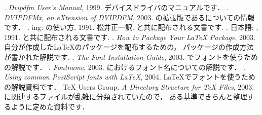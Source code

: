 \begin{myreferences}
%
 . \newblock
  {\em Dvipdfm User's Manual}, 1999. 
 \sanko {}
 \sanko デバイスドライバのマニュアルです．
%
 . \newblock
  {\em DVIPDFMx, an eXtension of DVIPDFM}, 2003.
  \sanko \webDvipdfmx
  \sanko {}の拡張版である\prog{\Dvipdfmx}についての情報です．
%
 . \newblock
  \BibTeX ing: \BibTeX の使い方, 1991. 松井正一訳.
  \sanko {\JBibTeX}と共に配布される文書です. 
%
 . \newblock
  日本語\BibTeX: \JBibTeX, 1991.
  \sanko {\JBibTeX}と共に配布される文書です.
%
 .  \newblock
  {\em How to Package Your {\LaTeX} Package}, 2003.
  \sanko {}
  \sanko 自分が作成した{\LaTeX}のパッケージを配布するための，
  パッケージの作成方法が書かれた解説です.
%
 .  \newblock
  {\em The Font Installation Guide}, 2003. 
  \sanko {}
  \sanko {\LaTeX}で{\PS}フォントを使うための解説です．
%
 .  \newblock
  {\em Fontname}, 2003. 
  \sanko {}
  \sanko {\LaTeX}におけるフォント名についての解説です．
%
 .  \newblock
  {\em Using common PostScript fonts with \LaTeX}, 2004. 
  \sanko {}
  \sanko \LaTeX で\PS フォントを使うための解説資料です．
%
 {\TeX} Users Group.  \newblock
  {\em A Directory Structure for {\TeX} Files}, 2003. 
  \sanko {}
  \sanko {\TeX}に関連するファイルが乱雑に分類されていたので，
  ある基準できちんと整理するように定めた資料です．
\end{myreferences}


